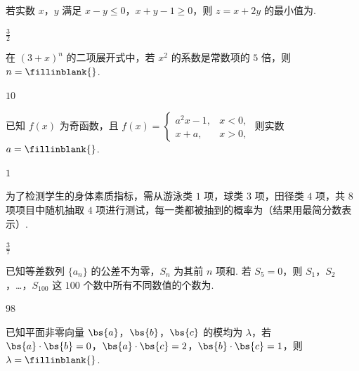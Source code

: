 \begin{problem}
若实数 \(x\)，\(y\) 满足 \(x-y\le0\)，\(x+y-1\ge0\)，则 \(z=x+2y\) 的最小值为\fillinblank{}.
\end{problem}

\begin{answer}
\(\frac32\)
\end{answer}

\begin{problem}
在 \((3+x)^n\) 的二项展开式中，若 \(x^2\) 的系数是常数项的 \(5\) 倍，则 \(n=\fillinblank{}\).
\end{problem}

\begin{answer}
\(10\)
\end{answer}

\begin{problem}
已知 \(f(x)\) 为奇函数，且 \(f(x)=\begin{cases}
a^2x-1, & x<0,\\
x+a, & x>0,
\end{cases}\) 则实数 \(a=\fillinblank{}\).
\end{problem}

\begin{answer}
\(1\)
\end{answer}

\begin{problem}
为了检测学生的身体素质指标，需从游泳类 \(1\) 项，球类 \(3\) 项，田径类 \(4\) 项，共 \(8\) 项项目中随机抽取 \(4\) 项进行测试，每一类都被抽到的概率为\fillinblank{}（结果用最简分数表示）.
\end{problem}

\begin{answer}
\(\frac37\)
\end{answer}

\begin{problem}
已知等差数列 \(\{a_n\}\) 的公差不为零，\(S_n\) 为其前 \(n\) 项和. 若 \(S_5=0\)，则 \(S_1\)，\(S_2\)，\ldots，\(S_{100}\) 这 \(100\) 个数中所有不同数值的个数为\fillinblank{}.
\end{problem}

\begin{answer}
\(98\)
\end{answer}

\begin{problem}
已知平面非零向量 \(\bs{a}\)，\(\bs{b}\)，\(\bs{c}\) 的模均为 \(\lambda\)，若 \(\bs{a}\cdot\bs{b}=0\)，\(\bs{a}\cdot\bs{c}=2\)，\(\bs{b}\cdot\bs{c}=1\)，则 \(\lambda=\fillinblank{}\).
\end{problem}

